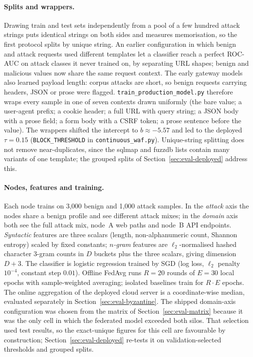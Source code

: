 \paragraph{Splits and wrappers.}
Drawing train and test sets independently from a pool of a few hundred attack strings puts identical strings on both sides and measures memorisation, so the first protocol splits by unique string. An earlier configuration in which benign and attack requests used different templates let a classifier reach a perfect ROC-AUC on attack classes it never trained on, by separating URL shapes; benign and malicious values now share the same request context. The early gateway models also learned payload length: corpus attacks are short, so benign requests carrying headers, JSON or prose were flagged. \texttt{train\_production\_model.py} therefore wraps every sample in one of seven contexts drawn uniformly (the bare value; a user-agent prefix; a cookie header; a full URL with query string; a JSON body with a prose field; a form body with a CSRF token; a prose sentence before the value). The wrappers shifted the intercept to $b\approx-5.57$ and led to the deployed $\tau=0.15$ (\texttt{BLOCK\_THRESHOLD} in \texttt{continuous\_waf.py}). Unique-string splitting does not remove near-duplicates, since the sqlmap and fuzzdb lists contain many variants of one template; the grouped splits of Section~\ref{sec:eval-deployed} address this.

\paragraph{Nodes, features and training.}
Each node trains on 3{,}000 benign and 1{,}000 attack samples. In the \emph{attack} axis the nodes share a benign profile and see different attack mixes; in the \emph{domain} axis both see the full attack mix, node~A web paths and node~B API endpoints. \emph{Syntactic} features are three scalars (length, non-alphanumeric count, Shannon entropy) scaled by fixed constants; \emph{$n$-gram} features are $\ell_2$-normalised hashed character 3-gram counts in $D$ buckets plus the three scalars, giving dimension $D+3$. The classifier is logistic regression trained by SGD (log loss, $\ell_2$ penalty $10^{-4}$, constant step $0.01$). Offline FedAvg runs $R=20$ rounds of $E=30$ local epochs with sample-weighted averaging; isolated baselines train for $R\cdot E$ epochs. The online aggregation of the deployed cloud server is a coordinate-wise median, evaluated separately in Section~\ref{sec:eval-byzantine}. The shipped domain-axis configuration was chosen from the matrix of Section~\ref{sec:eval-matrix} because it was the only cell in which the federated model exceeded both silos. That selection used test results, so the exact-unique figures for this cell are favourable by construction; Section~\ref{sec:eval-deployed} re-tests it on validation-selected thresholds and grouped splits.

